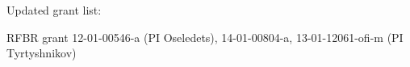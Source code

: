 Updated grant list: 

RFBR grant 12-01-00546-a (PI Oseledets), 14-01-00804-a, 13-01-12061-ofi-m (PI Tyrtyshnikov)





